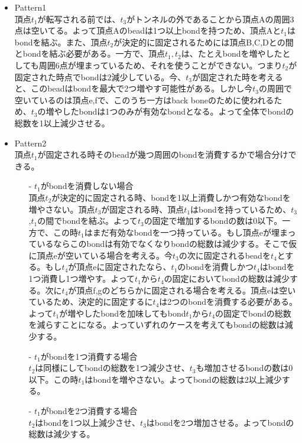 \documentclass[a4,dvipdfmx,11pt]{article}
\theoremstyle{definition}
\begin{document}
\begin{itemize}
\item{Pattern1}\\
  頂点$t_1$が転写される前では、$t_3$がトンネルの外であることから頂点Aの周囲3点は空いてる。よって頂点Aのbeadは1つ以上bondを持つため、頂点Aと$t_1$はbondを結ぶ。また、頂点$t_2$が決定的に固定されるためには頂点B,C,Dとの間とbondを結ぶ必要がある。一方で、頂点$t_1,t_2$は、たとえbondを増やしたとしても周囲6点が埋まっているため、それを使うことができない。つまり$t_2$が固定された時点でbondは$2$減少している。今、$t_3$が固定された時を考えると、このbeadはbondを最大で2つ増やす可能性がある。しかし今$t_3$の周囲で空いているのは頂点e,fで、このうち一方はback boneのために使われるため、$t_3$の増やしたbondは1つのみが有効なbondとなる。よって全体でbondの総数を1以上減少させる。

\item{Pattern2}\\
  頂点$t_1$が固定される時そのbeadが幾つ周囲のbondを消費するかで場合分けできる。
  \begin{itemize}
  \item[-]{$t_1$がbondを消費しない場合}\\
    頂点$t_2$が決定的に固定される時、bondを1以上消費しかつ有効なbondを増やさない。頂点$t_3$が固定される時、頂点$t_1$はbondを持っているため、$t_3$,$t_1$の間でbondを結ぶ。よって$t_3$の固定で増加するbondの数は0以下。一方で、この時$t_1$はまだ有効なbondを一つ持っている。もし頂点eが埋まっているならこのbondは有効でなくなりbondの総数は減少する。そこで仮に頂点eが空いている場合を考える。今$t_3$の次に固定されるbeadを$t_4$とする。もし$t_4$が頂点eに固定されたなら、$t_1$のbondを消費しかつ$t_4$はbondを1つ消費し1つ増やす。よって$t_1$から$t_4$の固定においてbondの総数は減少する。次に$t_4$が頂点f,gのどちらかに固定される場合を考える。頂点eは空いているため、決定的に固定するに$t_4$は2つのbondを消費する必要がある。よって$t_1$が増やしたbondを加味してもbond$t_1$から$t_4$の固定でbondの総数を減らすことになる。よっていずれのケースを考えてもbondの総数は減少する。

  \item[-]{$t_1$がbondを1つ消費する場合}\\
    $t_2$は同様にしてbondの総数を1つ減少させ、$t_3$も増加させるbondの数は0以下。この時$t_1$はbondを増やさない。よってbondの総数は2以上減少する。
  \item[-]{$t_1$がbondを2つ消費する場合}\\
    $t_2$はbondを1つ以上減少させ、$t_3$はbondを2つ増加させる。よってbondの総数は減少する。
  \end{itemize}
\end{itemize}
\end{document}
